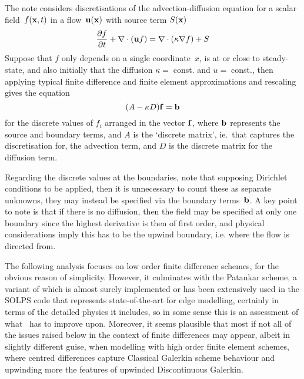The note considers discretisations of the advection-diffusion equation for
a scalar field~$f({\bf x},t)$ in a flow~${\bf u}({\bf x})$ with source term $S({\bf x})$
\begin{equation} \label{eq:advdif}
\frac{\partial f}{\partial t} + \nabla \cdot ({\bf u} f) = \nabla \cdot (\kappa \nabla f) + S
\end{equation}
Suppose that $f$ only depends on a single coordinate~$x$, is at or close to steady-state, and
also initially that the diffusion $\kappa=\;$const. and $u=\;$const.,  then applying typical
finite difference and finite element
approximations and rescaling gives the equation  
\begin{equation} \label{eq:advdifd}
(A -\kappa D) {\bf f}={\bf b}
\end{equation}
for the discrete values of $f_i$ arranged in the vector ${\bf f}$, where ${\bf b}$ represents the
source and boundary terms, and $A$ is the `discrete matrix', ie.\  that captures the discretisation for,
the advection term, and $D$ is the discrete matrix for the diffusion term.

Regarding the discrete values at the boundaries, note that supposing Dirichlet  conditions to be applied,
then it is unnecessary to count these as separate unknowns, they may instead be specified via the
boundary terms~${\bf b}$. A key point to note is that if there is no diffusion, then the field may be
specified at only one boundary since the highest derivative is then of first order, and
physical considerations imply this has to be the upwind boundary, i.e. where the flow is directed from.

The following analysis focuses on low order finite difference schemes,
for the obvious reason of simplicity.
However, it culminates with the Patankar scheme, a variant of which is almost surely implemented
or has been extensively used in the SOLPS code that represents state-of-the-art for edge modelling, 
certainly in terms of the detailed physics it includes, so in some sense this is an assessment
of what \nep\ has to improve upon. Moreover, it seems plausible that most if not all of the issues
raised below in the context of finite differences may appear,
albeit in slightly different guise, when modelling with high order finite element schemes,
where centred differences capture Classical Galerkin scheme behaviour and upwinding 
more the features of upwinded Discontinuous Galerkin.

